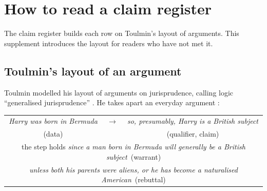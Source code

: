 
\section{How to read a claim register}
\label{app:reading}

The claim register builds each row on Toulmin's layout of arguments.  This
supplement introduces the layout for readers who have not met it.

\subsection{Toulmin's layout of an argument}

Toulmin modelled his layout of arguments on jurisprudence, calling logic
``generalised jurisprudence'' \citep[p.~7]{toulmin2003}.  He takes apart an
everyday argument \citep[pp.~92--94]{toulmin2003}:

\begin{center}
\small
\begin{tabular}{@{}c@{\quad}c@{\quad}c@{}}
\textit{Harry was born in Bermuda} & $\longrightarrow$ & \textit{so, presumably, Harry is a British subject} \\
(data) & & (qualifier, claim) \\[6pt]
\multicolumn{3}{c}{the step holds \emph{since} \textit{a man born in Bermuda will generally be a British subject}\ (warrant)} \\[2pt]
\multicolumn{3}{c}{\emph{unless} \textit{both his parents were aliens, or he has become a naturalised American}\ (rebuttal)} \\
\end{tabular}
\end{center}


